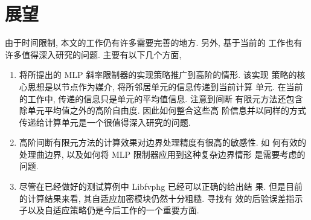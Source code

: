 \section{展望}
\label{sec:zhanwang}
由于时间限制, 本文的工作仍有许多需要完善的地方. 另外, 基于当前的
工作也有许多值得深入研究的问题. 主要有以下几个方面,
\begin{enumerate}
\item 将所提出的 MLP 斜率限制器的实现策略推广到高阶的情形. 该实现
  策略的核心思想是以节点作为媒介, 将所邻居单元的信息传递到当前计算
  单元. 在当前的工作中, 传递的信息只是单元的平均值信息. 注意到间断
  有限元方法还包含除单元平均值之外的高阶自由度. 因此如何整合这些高
  阶信息并以同样的方式传递给计算单元是一个很值得深入研究的问题.
\item 高阶间断有限元方法的计算效果对边界处理精度有很高的敏感性. 如
  何有效的处理曲边界, 以及如何将 MLP 限制器应用到这种复杂边界情形
  是需要考虑的问题.
\item 尽管在已经做好的测试算例中 Libfvphg 已经可以正确的给出结
  果. 但是目前的计算结果来看, 其自适应加密模块仍然十分粗糙. 寻找有
  效的后验误差指示子以及自适应策略仍是今后工作的一个重要方面.
\end{enumerate}
